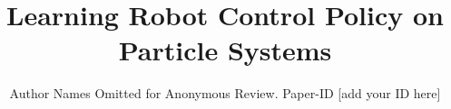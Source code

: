 \documentclass[conference]{IEEEtran}
\begin{document}
\title{Learning Robot Control Policy on Particle Systems}
\author{Author Names Omitted for Anonymous Review. Paper-ID [add your ID here]}
\maketitle

%
\IEEEpeerreviewmaketitle







\clearpage
\begingroup
\renewcommand{\bibfont}{\small}


\endgroup
\end{document}
